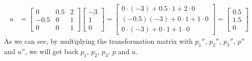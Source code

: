 \documentclass{article}
\begin{document}
\begin{align*}
	u & = \begin{bmatrix}0&0.5&2\\ -0.5&0&1\\ 0&0&1\end{bmatrix} \begin{bmatrix}-3\\ 1\\ 0\end{bmatrix} = \begin{bmatrix}0\cdot \left(-3\right)+0.5\cdot 1+2\cdot 0\\ \left(-0.5\right)\left(-3\right)+0\cdot 1+1\cdot 0\\ 0\cdot \left(-3\right)+0\cdot 1+1\cdot 0\end{bmatrix} = \begin{bmatrix}0.5\\ 1.5\\ 0\end{bmatrix}
\end{align*}
As we can see, by multiplying the transformation matrix with $p_1''$, $p_2''$, $p_3''$, $p''$ and $u''$, we will get back $p_1$, $p_2$, $p_3$, $p$ and $u$.
\end{document}
